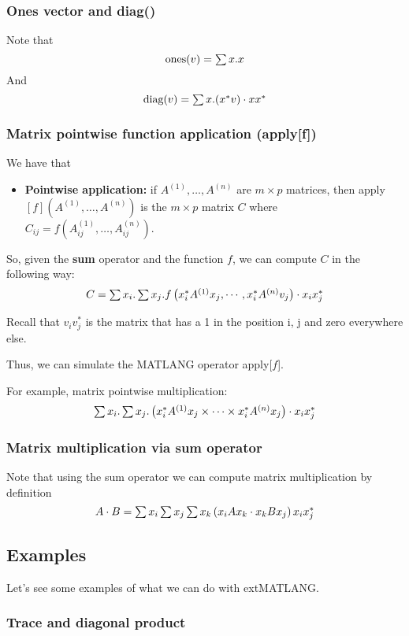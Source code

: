 \subsubsection{Ones vector and diag()}

Note that $$\text{ones}(v)=\textstyle\sum x. x$$ And $$\text{diag}(v)=\textstyle\sum x. (x^*v)\cdot xx^*$$

\subsubsection{Matrix pointwise function application (apply[f])}

We have that 

\begin{itemize}
	\item \textbf{Pointwise application:} if $A^{(1)}, \ldots, A^{(n)}$ are $m\times p$ matrices, then apply$\left[ f \right](A^{(1)}, \ldots, A^{(n)})$ is the $m\times p$ matrix $C$ where $C_{ij}=f(A^{(1)}_{ij}, \ldots, A^{(n)}_{ij})$.
\end{itemize}

So, given the \textbf{sum} operator and the function $f$, we can compute $C$ in the following way: $$C=\textstyle\sum x_i.\textstyle\sum x_j. f\left( x_i^*A^{(1)}x_j, \cdots, x_i^*A^{(n)}v_j\right)\cdot x_ix_j^*$$

Recall that $v_iv_j^*$ is the matrix that has a 1 in the position i, j and zero everywhere else.

Thus, we can simulate the MATLANG operator apply[$f$].

For example, matrix pointwise multiplication: $$\textstyle\sum x_i.\textstyle\sum x_j.\left( x_i^*A^{(1)}x_j\times \cdots\times x_i^*A^{(n)}x_j\right)\cdot x_ix_j^*$$

\subsubsection{Matrix multiplication via sum operator}

Note that using the sum operator we can compute matrix multiplication by definition $$A\cdot B = \textstyle\sum x_i\textstyle\sum x_j\textstyle\sum x_k \left( x_iAx_k\cdot x_kBx_j\right)x_ix_j^*$$

\subsection{Examples}

Let's see some examples of what we can do with extMATLANG.

\subsubsection{Trace and diagonal product}

